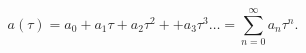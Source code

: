 \begin{equation}\label{a}
a(\tau)=a_0+a_1\tau+a_2\tau^2+ +a_3\tau^3\ldots =
\sum_{n=0}^{\infty}a_n\tau^n.
\end{equation}

